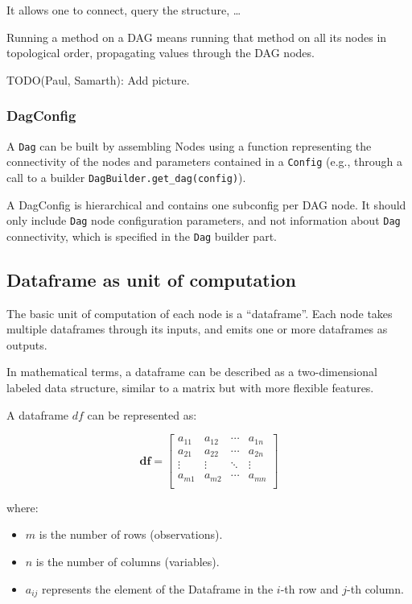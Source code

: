 \documentclass[11pt, reqno]{amsart}
\theoremstyle{definition}
\theoremstyle{remark}
\newcommand{\df}{\mathbf{df}}
\begin{document}
It allows one to connect, query the structure, \ldots{}

Running a method on a DAG means running that method on all its nodes in
topological order, propagating values through the DAG nodes.

TODO(Paul, Samarth): Add picture.

\subsubsection{DagConfig}
A \verb|Dag| can be built by assembling Nodes using a function representing the
connectivity of the nodes and parameters contained in a \verb|Config| (e.g.,
through a call to a builder \verb|DagBuilder.get_dag(config)|).

A DagConfig is hierarchical and contains one subconfig per DAG node. It should
only include \verb|Dag| node configuration parameters, and not information
about \verb|Dag| connectivity, which is specified in the \verb|Dag| builder
part.

\subsection{Dataframe as unit of computation}
The basic unit of computation of each node is a ``dataframe''. Each node
takes multiple dataframes through its inputs, and emits one or more
dataframes as outputs.

In mathematical terms, a dataframe can be described as a two-dimensional
labeled data structure, similar to a matrix but with more flexible features.

A dataframe $df$ can be represented as:

$$
  \df = \left[ \begin{array}{cccc}
      a_{11} & a_{12} & \cdots & a_{1n} \\
      a_{21} & a_{22} & \cdots & a_{2n} \\
      \vdots & \vdots & \ddots & \vdots \\
      a_{m1} & a_{m2} & \cdots & a_{mn} \\
    \end{array} \right]
$$

where:
\begin{itemize}
  \item $m$ is the number of rows (observations).
  \item $n$ is the number of columns (variables).
  \item $a_{ij}$ represents the element of the Dataframe in the $i$-th row
        and $j$-th column.
\end{itemize}
\end{document}
